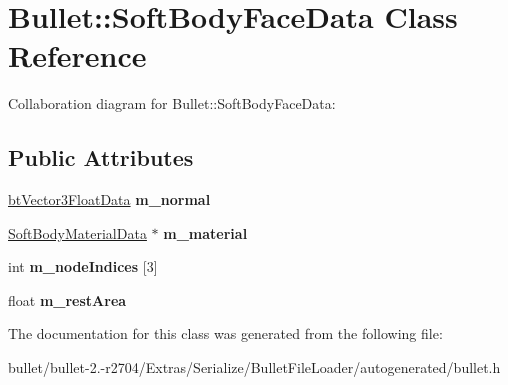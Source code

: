 \hypertarget{class_bullet_1_1_soft_body_face_data}{\section{Bullet\+:\+:Soft\+Body\+Face\+Data Class Reference}
\label{class_bullet_1_1_soft_body_face_data}
}


Collaboration diagram for Bullet\+:\+:Soft\+Body\+Face\+Data\+:
\subsection*{Public Attributes}
\begin{DoxyCompactItemize}
\item 
\hypertarget{class_bullet_1_1_soft_body_face_data_abefbf9c461c7d1934ed71c0711d47c19}{\hyperlink{class_bullet_1_1bt_vector3_float_data}{bt\+Vector3\+Float\+Data} {\bfseries m\+\_\+normal}}\label{class_bullet_1_1_soft_body_face_data_abefbf9c461c7d1934ed71c0711d47c19}

\item 
\hypertarget{class_bullet_1_1_soft_body_face_data_a540b51da8443afb6fb982dba00df8e72}{\hyperlink{class_bullet_1_1_soft_body_material_data}{Soft\+Body\+Material\+Data} $\ast$ {\bfseries m\+\_\+material}}\label{class_bullet_1_1_soft_body_face_data_a540b51da8443afb6fb982dba00df8e72}

\item 
\hypertarget{class_bullet_1_1_soft_body_face_data_a402ee4428d12dcd72af32540a1237168}{int {\bfseries m\+\_\+node\+Indices} \mbox{[}3\mbox{]}}\label{class_bullet_1_1_soft_body_face_data_a402ee4428d12dcd72af32540a1237168}

\item 
\hypertarget{class_bullet_1_1_soft_body_face_data_ac9cdea15c46d4eaa97960012c93e1f6f}{float {\bfseries m\+\_\+rest\+Area}}\label{class_bullet_1_1_soft_body_face_data_ac9cdea15c46d4eaa97960012c93e1f6f}

\end{DoxyCompactItemize}


The documentation for this class was generated from the following file\+:\begin{DoxyCompactItemize}
\item 
bullet/bullet-\/2.-\/r2704/\+Extras/\+Serialize/\+Bullet\+File\+Loader/autogenerated/bullet.\+h\end{DoxyCompactItemize}
